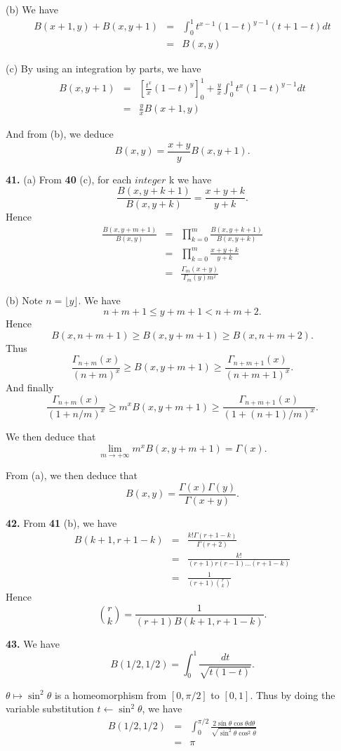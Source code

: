 \documentclass[a4paper,12pt]{article}
\newcommand{\newpar}[1]{\bigskip \noindent \textbf{#1.}}
\newcommand{\subpar}[1]{\medskip \noindent (#1)}
\newcommand{\la}{\leftarrow}
\begin{document}
\subpar{b} We have
\begin{eqnarray*}
  B(x+1, y) + B(x, y+1) &=& \int_0^1 t^{x-1}(1-t)^{y-1}(t + 1 - t)
  dt\\
  &=& B(x, y)
\end{eqnarray*}

\subpar{c} By using an integration by parts, we have
\begin{eqnarray*}
  B(x, y+1) &=& \left[ \frac{t^x}{x}(1-t)^y \right]_0^1 +
  \frac{y}{x}\int_0^1 t^x (1-t)^{y-1} dt \\
  &=& \frac{y}{x} B(x+1, y)
\end{eqnarray*}

And from (b), we deduce
\[ B(x, y) = \frac{x+y}{y} B(x, y+1).\]

\newpar{41} \subpar{a} From \textbf{40} (c), for each $integer$ k we have
\[ \frac{B(x, y + k + 1)}{B(x, y+k)} = \frac{x + y + k}{y+k}.\]
Hence
\begin{eqnarray*}
  \frac{B(x, y+m+1)}{B(x, y)} &=& \prod_{k=0}^m \frac{B(x,
    y+k+1)}{B(x, y+k)} \\
  &=& \prod_{k=0}^m \frac{x+y+k}{y+k} \\
  &=& \frac{\Gamma_m(x+y)}{\Gamma_m(y)m^x}
\end{eqnarray*}

\subpar{b} Note $n = \lfloor y\rfloor$.  We have
\[ n + m + 1 \le y + m + 1 < n+m+2.\]
Hence
\[ B(x, n+m+1) \ge B(x, y+m+1) \ge B(x, n+m+2).\]
Thus
\[ \frac{\Gamma_{n+m}(x)}{(n+m)^x} \ge B(x, y+m+1) \ge
\frac{\Gamma_{n+m+1}(x)}{(n+m+1)^x}.\]
And finally
\[ \frac{\Gamma_{n+m}(x)}{(1+n/m)^x} \ge m^x B(x, y+m+1) \ge
\frac{\Gamma_{n+m+1}(x)}{(1+(n+1)/m)^x}.\]

We then deduce that
\[ \lim_{m \to +\infty} m^x B(x, y+m+1) = \Gamma(x).\]

From (a), we then deduce that
\[ B(x, y) = \frac{\Gamma(x) \Gamma(y)}{\Gamma(x+y)}.\]

\newpar{42}  From \textbf{41} (b), we have
\begin{eqnarray*}
  B(k+1, r+1-k) &=& \frac{k!\Gamma(r+1-k)}{\Gamma(r+2)} \\
  &=& \frac{k!}{(r+1)r(r-1) \ldots (r+1-k)} \\
  &=& \frac{1}{(r+1){r \choose k}}
\end{eqnarray*}
Hence
\[ {r \choose k} = \frac{1}{(r+1)B(k+1, r+1-k)}.\]

\newpar{43} We have
\[ B(1/2, 1/2) = \int_0^1 \frac{dt}{\sqrt{t(1-t)}}.\]

$\theta \mapsto \sin^2\theta$ is a homeomorphism from $[0, \pi/2]$ to
$[0, 1]$. Thus by doing the variable substitution $t \la
\sin^2\theta$, we have
\begin{eqnarray*}
  B(1/2, 1/2) &=& \int_0^{\pi/2} \frac{2 \sin\theta \cos\theta
    d\theta}{\sqrt{\sin^2\theta \cos^2\theta}} \\
  &=& \pi
\end{eqnarray*}
\end{document}
